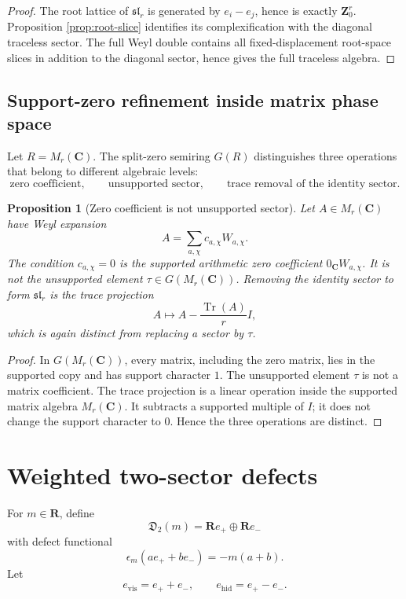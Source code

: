 \documentclass[11pt]{article}
\newcommand{\C}{\mathbf C}
\newcommand{\R}{\mathbf R}
\newcommand{\Z}{\mathbf Z}
\newcommand{\Tr}{\operatorname{Tr}}
\theoremstyle{plain}
\newtheorem{proposition}[theorem]{Proposition}
\theoremstyle{definition}
\begin{document}
\begin{proof}
The root lattice of \(\mathfrak{sl}_r\) is generated by \(e_i-e_j\), hence is exactly \(\Z_0^r\).  Proposition \ref{prop:root-slice} identifies its complexification with the diagonal traceless sector.  The full Weyl double contains all fixed-displacement root-space slices in addition to the diagonal sector, hence gives the full traceless algebra.
\end{proof}

\subsection{Support-zero refinement inside matrix phase space}

Let \(R=M_r(\C)\).  The split-zero semiring \(G(R)\) distinguishes three operations that belong to different algebraic levels:
\[
   \text{zero coefficient},
   \qquad
   \text{unsupported sector},
   \qquad
   \text{trace removal of the identity sector}.
\]

\begin{proposition}[Zero coefficient is not unsupported sector]\label{prop:zero-not-unsupported}
Let \(A\in M_r(\C)\) have Weyl expansion
\[
   A=\sum_{a,\chi}c_{a,\chi}W_{a,\chi}.
\]
The condition \(c_{a,\chi}=0\) is the supported arithmetic zero coefficient \(0_\C W_{a,\chi}\).  It is not the unsupported element \(\tau\in G(M_r(\C))\).  Removing the identity sector to form \(\mathfrak{sl}_r\) is the trace projection
\[
   A\mapsto A-\frac{\Tr(A)}rI,
\]
which is again distinct from replacing a sector by \(\tau\).
\end{proposition}

\begin{proof}
In \(G(M_r(\C))\), every matrix, including the zero matrix, lies in the supported copy and has support character \(1\).  The unsupported element \(\tau\) is not a matrix coefficient.  The trace projection is a linear operation inside the supported matrix algebra \(M_r(\C)\).  It subtracts a supported multiple of \(I\); it does not change the support character to \(0\).  Hence the three operations are distinct.
\end{proof}

\section{Weighted two-sector defects}

For \(m\in\R\), define
\[
   \mathfrak D_2(m)=\R e_+\oplus\R e_-
\]
with defect functional
\[
   \epsilon_m(ae_++be_-)=-m(a+b).
\]
Let
\[
   e_{\operatorname{vis}}=e_++e_-,
   \qquad
   e_{\operatorname{hid}}=e_+-e_-.
\]
\end{document}
